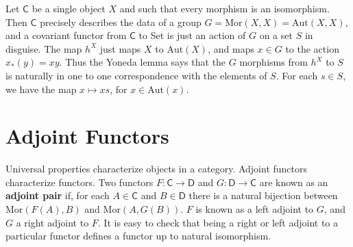 \begin{example}
    Let $\mathsf{C}$ be a single object $X$ and such that every morphism is an isomorphism. Then $\mathsf{C}$ precisely describes the data of a group $G = \text{Mor}(X,X) = \text{Aut}(X,X)$, and a covariant functor from $\mathsf{C}$ to {\sf Set} is just an action of $G$ on a set $S$ in disguise. The map $h^X$ just maps $X$ to $\text{Aut}(X)$, and maps $x \in G$ to the action $x_*(y) = xy$. Thus the Yoneda lemma says that the $G$ morphisms from $h^X$ to $S$ is naturally in one to one correspondence with the elements of $S$. For each $s \in S$, we have the map $x \mapsto xs$, for $x \in \text{Aut}(x)$.
\end{example}




\section{Adjoint Functors}

Universal properties characterize objects in a category. Adjoint functors characterize functors. Two functors $F: \mathsf{C} \to \mathsf{D}$ and $G: \mathsf{D} \to \mathsf{C}$ are known as an {\bf adjoint pair} if, for each $A \in \mathsf{C}$ and $B \in \mathsf{D}$ there is a natural bijection between $\text{Mor}(F(A), B)$ and $\text{Mor}(A,G(B))$. $F$ is known as a left adjoint to $G$, and $G$ a right adjoint to $F$. It is easy to check that being a right or left adjoint to a particular functor defines a functor up to natural isomorphism.

